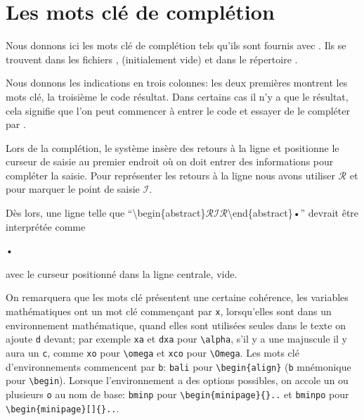 \section{Les mots clé de complétion}
\label{sec.autocompletion}

Nous donnons ici les mots clé de complétion tels qu'ils sont fournis avec \Tw. Ils se trouvent dans les fichiers ,  (initialement vide) et  dans le répertoire .

Nous donnons les indications en trois colonnes: les deux premières montrent les mots clé, la troisième le code \AllTeX{} résultat. Dans certains cas il n'y a que le résultat, cela signifie que l'on peut commencer à entrer le code \AllTeX{} et essayer de le compléter par .

\newcommand{\AutoCompRet}{$\mathcal{R}$}
\newcommand{\AutoCompIns}{$\mathcal{I}$}
Lors de la complétion, le système insère des retours à la ligne et positionne le curseur de saisie au premier endroit où on doit entrer des informations pour compléter la saisie. Pour représenter les retours à la ligne nous avons utiliser \AutoCompRet{} et pour marquer le point de saisie \AutoCompIns.

Dès lors, une ligne telle que ``\textbackslash begin\{abstract\}{\AutoCompRet}{\AutoCompIns}{\AutoCompRet}\textbackslash end\{abstract\}•'' devrait être interprétée comme
\begin{verbExample}
\begin{abstract}

\end{abstract}•
\end{verbExample}
avec le curseur positionné dans la ligne centrale, vide.

On remarquera que les mots clé présentent une certaine cohérence, les variables mathématiques ont un mot clé commençant par \verb|x|, lorsqu'elles sont dans un environnement mathématique, quand elles sont utilisées seules dans le texte on ajoute \verb|d| devant; par exemple \verb|xa| et \verb|dxa| pour \verb|\alpha|, s'il y a une majuscule il y aura un \verb|c|, comme  \verb|xo| pour
\verb|\omega| et \verb|xco| pour \verb|\Omega|. Les mots clé d'environnements commencent par \verb|b|: \verb|bali| pour
\verb|\begin{align}| (\verb|b| mnémonique pour \verb|\begin|). Lorsque l'environnement a des options possibles, on accole un ou plusieurs \verb|o| au nom de base: \verb|bminp| pour \verb|\begin{minipage}{}..| et 
\verb|bminpo| pour \verb|\begin{minipage}[]{}..|.


